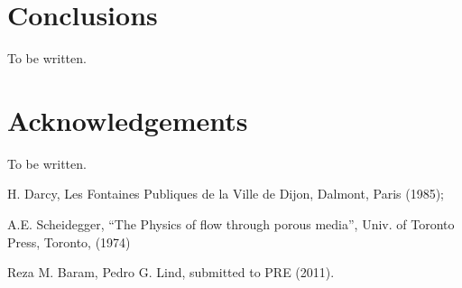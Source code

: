 \documentclass[aps,twocolumn,superscriptaddress,showpacs,showkeys]{revtex4-1}
\begin{document}
\section{Conclusions}
\label{sec:conclusions}
To be written.
\section*{Acknowledgements}
To be written.

\begin{thebibliography}{99}

 H. Darcy, Les Fontaines Publiques de la Ville de Dijon, Dalmont, Paris (1985);

 A.E. Scheidegger, ``The Physics of flow through porous media'', 
	Univ. of Toronto Press, Toronto, (1974)

 Reza M. Baram, Pedro G. Lind, submitted to PRE (2011).

\end{thebibliography}
\end{document}
